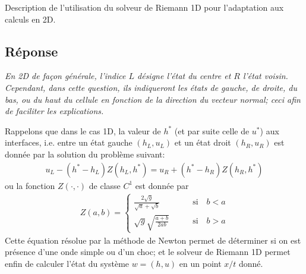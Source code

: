 \documentclass[
	french,
	11pt, %
]{fphw}
\begin{document}
\begin{problem}
	Description de l'utilisation du solveur de Riemann 1D pour l'adaptation aux calculs en 2D.
\end{problem}


\subsection*{Réponse} 

\textit{En 2D de façon générale, l'indice $L$ désigne l'état du centre et $R$ l'état voisin. Cependant, dans cette question, ils indiqueront les états de gauche, de droite, du bas, ou du haut du cellule en fonction de la direction du vecteur normal; ceci afin de faciliter les explications.}

Rappelons que dans le cas 1D, la valeur de $h^*$ (et par suite celle de $u^*$) aux interfaces, i.e. entre un état gauche $(h_L,u_L)$ et un état droit $(h_R,u_R)$ est donnée par la solution du problème suivant:
\begin{align*}
	u_L - (h^* - h_L)Z(h_L, h^*) = u_R + (h^* - h_R)Z(h_R, h^*)
\end{align*}
ou la fonction $Z(\cdot, \cdot)$ de classe $C^1$ est donnée par
\begin{align*}
	Z(a,b) = 
	\begin{cases}
		\frac{2\sqrt{g}}{\sqrt{a}+\sqrt{b}}	 &\qquad	\text{si} \quad b<a \\
		\sqrt{g}\sqrt{\frac{a+b}{2ab}}	 &\qquad	\text{si} \quad b>a 
	\end{cases}
\end{align*}
Cette équation résolue par la méthode de Newton permet de déterminer si on est présence d'une onde simple ou d'un choc; et le solveur de Riemann 1D permet enfin de calculer l'état du système $w = (h,u)$ en un point $x/t$ donné.
\end{document}
